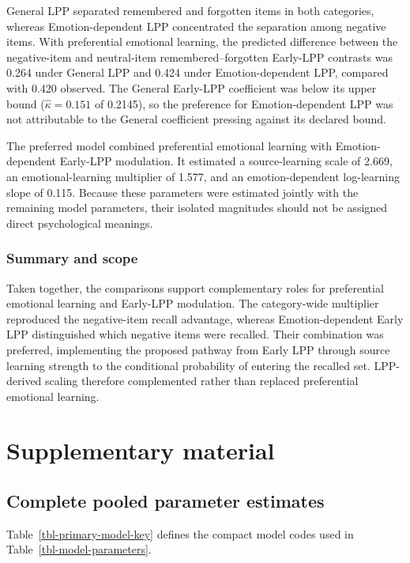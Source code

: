 \documentclass[
  man,
  longtable,
  nolmodern,
  notxfonts,
  notimes,
  draftfirst,
  colorlinks=true,linkcolor=blue,citecolor=blue,urlcolor=blue]{apa7}
\begin{document}
General LPP separated remembered and forgotten items in both categories,
whereas Emotion-dependent LPP concentrated the separation among negative
items. With preferential emotional learning, the predicted difference
between the negative-item and neutral-item remembered--forgotten
Early-LPP contrasts was 0.264 under General LPP and 0.424 under
Emotion-dependent LPP, compared with 0.420 observed. The General
Early-LPP coefficient was below its upper bound (\(\hat\kappa=0.151\) of
0.2145), so the preference for Emotion-dependent LPP was not
attributable to the General coefficient pressing against its declared
bound.

The preferred model combined preferential emotional learning with
Emotion-dependent Early-LPP modulation. It estimated a source-learning
scale of 2.669, an emotional-learning multiplier of 1.577, and an
emotion-dependent log-learning slope of 0.115. Because these parameters
were estimated jointly with the remaining model parameters, their
isolated magnitudes should not be assigned direct psychological
meanings.

\subsubsection{Summary and scope}\label{summary-and-scope}

Taken together, the comparisons support complementary roles for
preferential emotional learning and Early-LPP modulation. The
category-wide multiplier reproduced the negative-item recall advantage,
whereas Emotion-dependent Early LPP distinguished which negative items
were recalled. Their combination was preferred, implementing the
proposed pathway from Early LPP through source learning strength to the
conditional probability of entering the recalled set. LPP-derived
scaling therefore complemented rather than replaced preferential
emotional learning.

\section{Supplementary material}\label{supplementary-material}

\subsection{Complete pooled parameter
estimates}\label{complete-pooled-parameter-estimates}

Table~\ref{tbl-primary-model-key} defines the compact model codes used
in Table~\ref{tbl-model-parameters}.
\end{document}
